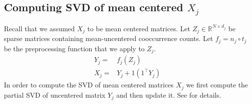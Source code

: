\documentclass[11pt]{article}
\begin{document}
\subsection{Computing SVD of mean centered $X_j$}
\label{ssec:svdmc}
Recall that we assumed $X_j$ to be mean centered matrices. Let $Z_j
\in \mathbb{R}^{N \times d_j}$ be sparse matrices containing
mean-uncentered cooccurrence counts. Let $f_j = n_j \circ t_j $ be the preprocessing
function that we apply to $Z_j$. 
\begin{align}
  Y_j =& f_j (Z_j) \\
  X_j =& Y_j + 1 (1^\top Y_j)
\end{align}
In order to compute the SVD of mean centered matrices $X_j$ we first
compute the partial SVD of uncentered 
matrix $Y_j$ and then update it. See \cite{brand2006fast} for details.
\end{document}
